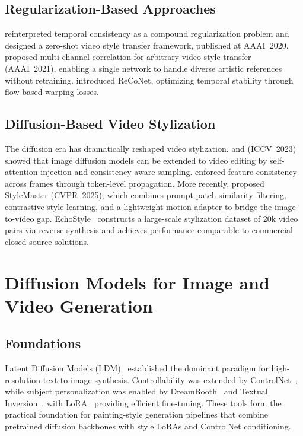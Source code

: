 \documentclass[letterpaper,twocolumn,10pt]{article}
\begin{document}
\subsection{Regularization-Based Approaches}

\citet{wang2020consistent} reinterpreted temporal consistency as a compound
regularization problem and designed a zero-shot video style transfer framework,
published at AAAI~2020. \citet{deng2021arbitrary} proposed multi-channel correlation for
arbitrary video style transfer (AAAI~2021), enabling a single network to handle diverse
artistic references without retraining. \citet{gao2020reconet} introduced ReCoNet,
optimizing temporal stability through flow-based warping losses.

\subsection{Diffusion-Based Video Stylization}

The diffusion era has dramatically reshaped video stylization. \citet{ceylan2023pix2video}
and \citet{chai2023stablevideo} (ICCV~2023) showed that image diffusion models can be
extended to video editing by self-attention injection and consistency-aware sampling.
\citet{geyer2023tokenflow} enforced feature consistency across frames through token-level
propagation. More recently, \citet{ye2025stylemaster} proposed StyleMaster (CVPR~2025),
which combines prompt-patch similarity filtering, contrastive style learning, and a
lightweight motion adapter to bridge the image-to-video gap. EchoStyle~\cite{li2026echostyle}
constructs a large-scale stylization dataset of 20k video pairs via reverse synthesis and
achieves performance comparable to commercial closed-source solutions.

\section{Diffusion Models for Image and Video Generation}
\label{sec:diffusion}

\subsection{Foundations}

Latent Diffusion Models (LDM)~\cite{rombach2022ldm} established the dominant paradigm
for high-resolution text-to-image synthesis. Controllability was extended by
ControlNet~\cite{zhang2023controlnet}, while subject personalization was enabled by
DreamBooth~\cite{ruiz2023dreambooth} and Textual Inversion~\cite{gal2023textualinversion},
with LoRA~\cite{hu2022lora} providing efficient fine-tuning. These tools form the
practical foundation for painting-style generation pipelines that combine pretrained
diffusion backbones with style LoRAs and ControlNet conditioning.
\end{document}
